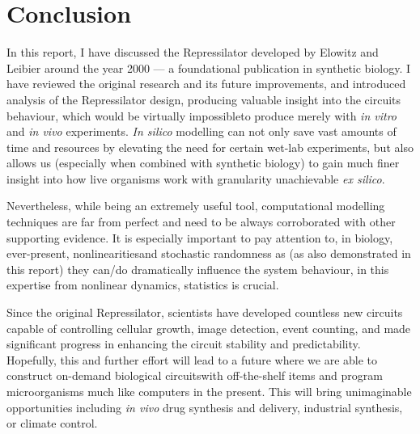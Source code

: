 \documentclass[runningheads,a4paper]{llncs}
\begin{document}
\clearpage
\section*{Conclusion}
In this report, I have discussed the Repressilator developed by Elowitz and Leibier around the year 2000\cite{Elowitz2000d} --- a foundational publication in synthetic biology. I have reviewed the original research and its future improvements, and introduced analysis of the Repressilator design, producing valuable insight into the circuits behaviour, which would be virtually impossible\linebreak to produce merely with \textit{in vitro} and \textit{in vivo} experiments. \textit{In silico} modelling can not only save vast amounts of time and resources by elevating the need for certain wet-lab experiments, but also allows us (especially when combined with synthetic biology) to gain much finer insight into how live organisms work with granularity unachievable \textit{ex silico}.

Nevertheless, while being an extremely useful tool, computational modelling techniques are far from perfect and need to be always corroborated with other supporting evidence. It is especially important to pay attention to, in biology, ever-present, nonlinearities\linebreak and stochastic randomness as (as also demonstrated in this report) they can/do dramatically influence the system behaviour, in this expertise from nonlinear dynamics, statistics is crucial.

Since the original Repressilator, scientists have developed countless new circuits capable of controlling cellular growth, image detection, event counting, and made significant progress in enhancing the circuit stability and predictability\cite{Purcell2010a,Danino2010a}. Hopefully, this and further effort will lead to a future where we are able to construct on-demand biological circuits\linebreak with off-the-shelf items and program microorganisms much like computers in the present. This will bring unimaginable opportunities including \textit{in vivo} drug synthesis and delivery, industrial synthesis, or climate control.

%
\clearpage

\singlespacing
\twocolumn
\raggedright
\raggedbottom
{}
%
\small{}

%
\end{document}
